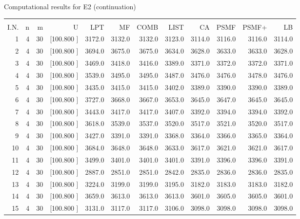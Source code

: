 \documentclass[12pt,a4paper]{article}
\begin{document}
\begin{center}
 Computational results for E2 (continuation) {\tiny
\begin{tabular}{r r r r r r r r r r r r}\hline
    &   &   &          &        &        &        &        &        &        &        &       \\[-0.1in]
  I.N.  &  n  &  m  &  U  &  LPT  &  MF  &  COMB  &  LIST  &  CA  & PSMF &PSMF+ & LB \\[0.03in]
\hline
   1&  4& 30&[100.800   ]&  3172.0&  3132.0&  3132.0&  3123.0&  3114.0&  3116.0&  3116.0&  3114.0\\[-0.02in]
   2&  4& 30&[100.800   ]&  3694.0&  3675.0&  3675.0&  3634.0&  3628.0&  3633.0&  3633.0&  3628.0\\[-0.02in]
   3&  4& 30&[100.800   ]&  3469.0&  3418.0&  3416.0&  3389.0&  3371.0&  3372.0&  3372.0&  3371.0\\[-0.02in]
   4&  4& 30&[100.800   ]&  3539.0&  3495.0&  3495.0&  3487.0&  3476.0&  3476.0&  3478.0&  3476.0\\[-0.02in]
   5&  4& 30&[100.800   ]&  3435.0&  3415.0&  3415.0&  3402.0&  3389.0&  3390.0&  3390.0&  3389.0\\[-0.02in]
   6&  4& 30&[100.800   ]&  3727.0&  3668.0&  3667.0&  3653.0&  3645.0&  3647.0&  3645.0&  3645.0\\[-0.02in]
   7&  4& 30&[100.800   ]&  3443.0&  3417.0&  3417.0&  3407.0&  3392.0&  3394.0&  3394.0&  3392.0\\[-0.02in]
   8&  4& 30&[100.800   ]&  3618.0&  3539.0&  3537.0&  3520.0&  3517.0&  3521.0&  3520.0&  3517.0\\[-0.02in]
   9&  4& 30&[100.800   ]&  3427.0&  3391.0&  3391.0&  3368.0&  3364.0&  3366.0&  3365.0&  3364.0\\[-0.02in]
  10&  4& 30&[100.800   ]&  3684.0&  3648.0&  3648.0&  3633.0&  3617.0&  3621.0&  3621.0&  3617.0\\[-0.02in]
  11&  4& 30&[100.800   ]&  3499.0&  3401.0&  3401.0&  3401.0&  3391.0&  3396.0&  3396.0&  3391.0\\[-0.02in]
  12&  4& 30&[100.800   ]&  2887.0&  2851.0&  2851.0&  2842.0&  2835.0&  2836.0&  2836.0&  2835.0\\[-0.02in]
  13&  4& 30&[100.800   ]&  3224.0&  3199.0&  3199.0&  3195.0&  3182.0&  3183.0&  3183.0&  3182.0\\[-0.02in]
  14&  4& 30&[100.800   ]&  3659.0&  3613.0&  3613.0&  3613.0&  3601.0&  3605.0&  3605.0&  3601.0\\[-0.02in]
  15&  4& 30&[100.800   ]&  3131.0&  3117.0&  3117.0&  3106.0&  3098.0&  3098.0&  3098.0&  3098.0\\[-0.02in]

\end{tabular}}
\end{center}
\end{document}
